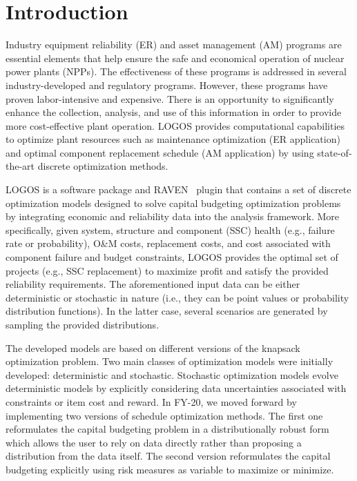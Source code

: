 \section{Introduction}
\label{sec:Introduction}

Industry equipment reliability (ER) and asset management (AM) programs are essential elements that
help ensure the safe and economical operation of nuclear power plants (NPPs). 
The effectiveness of
these programs is addressed in several industry-developed and regulatory programs. 
However, these programs have proven labor-intensive and expensive. 
There is an opportunity to significantly
enhance the collection, analysis, and use of this information in order to provide more cost-effective plant
operation. 
LOGOS provides computational capabilities to optimize plant resources such as
maintenance optimization (ER application) and optimal component replacement schedule (AM application)
by using state-of-the-art discrete optimization methods.

LOGOS is a software package and RAVEN~\cite{RAVEN,RAVENtheoryMan} plugin that
contains a set of discrete optimization models designed to solve capital budgeting optimization
problems by integrating economic and reliability data into the analysis framework. 
More specifically, given system, structure and component
(SSC) health (e.g., failure rate or probability), O\&M costs, replacement costs, and cost
associated with component failure and budget constraints, LOGOS provides the optimal set of projects
(e.g., SSC replacement) to maximize profit and satisfy the provided reliability requirements.
The aforementioned input data can be either deterministic or stochastic in nature (i.e., they can be point values or probability distribution functions). 
In the latter case, several scenarios are generated by
sampling the provided distributions.

The developed models are based on different versions of the knapsack optimization problem.
Two main classes of optimization models were initially developed: deterministic and stochastic.
Stochastic optimization models evolve deterministic models by explicitly considering data
uncertainties associated with constraints or item cost and reward. In FY-20, we moved forward
by implementing two versions of schedule optimization methods. The first one reformulates the
capital budgeting problem in a distributionally robust form which allows the user to rely on
data directly rather than proposing a distribution from the data itself. The second version
reformulates the capital budgeting explicitly using risk measures as variable to maximize or
minimize.

